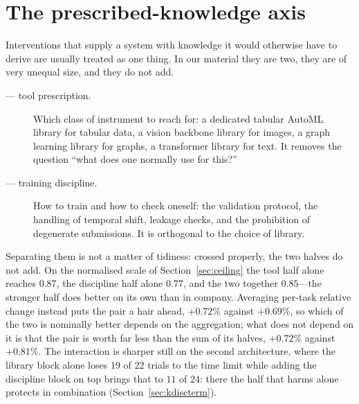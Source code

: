 \section{The prescribed-knowledge axis}
\label{sec:axis}

Interventions that supply a system with knowledge it would otherwise have to
derive are usually treated as one thing. In our material they are two, they are
of very unequal size, and they do not add.

\begin{description}
  \item[\Ktool{} --- tool prescription.] Which class of instrument to reach for:
        a dedicated tabular AutoML library for tabular data, a vision backbone
        library for images, a graph learning library for graphs, a transformer
        library for text. It removes the question ``what does one normally use
        for this?''
  \item[\Kdisc{} --- training discipline.] How to train and how to check
        oneself: the validation protocol, the handling of temporal shift,
        leakage checks, and the prohibition of degenerate submissions. It is
        orthogonal to the choice of library.
\end{description}

Separating them is not a matter of tidiness: crossed properly, the two halves do
not add. On the normalised scale of Section~\ref{sec:ceiling} the tool half
alone reaches $0.87$, the discipline half alone $0.77$, and the two together
$0.85$---the stronger half does better on its own than in company. Averaging
per-task relative change instead puts the pair a hair ahead, $+0.72\%$ against
$+0.69\%$, so which of the two is nominally better depends on the aggregation;
what does not depend on it is that the pair is worth far less than the sum of
its halves, $+0.72\%$ against $+0.81\%$. The
interaction is sharper still on the second architecture, where the library block
alone loses $19$ of $22$ trials to the time limit while adding the discipline
block on top brings that to $11$ of $24$: there the half that harms alone
protects in combination (Section~\ref{sec:kdiscterm}).

